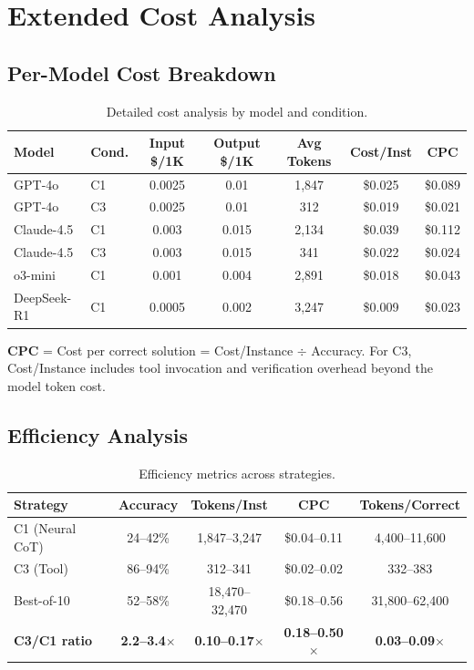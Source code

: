 \documentclass{article}
\theoremstyle{plain}
\theoremstyle{definition}
\theoremstyle{remark}
\begin{document}

\section{Extended Cost Analysis}
\label{app:cost_extended}

\subsection{Per-Model Cost Breakdown}

\begin{table}[h]
\centering
\caption{Detailed cost analysis by model and condition.}
\label{tab:cost_extended}
\small
\begin{tabular}{@{}llccccc@{}}
\toprule
\textbf{Model} & \textbf{Cond.} & \textbf{Input \$/1K} & \textbf{Output \$/1K} & \textbf{Avg Tokens} & \textbf{Cost/Inst} & \textbf{CPC} \\
\midrule
GPT-4o & C1 & 0.0025 & 0.01 & 1,847 & \$0.025 & \$0.089 \\
GPT-4o & C3 & 0.0025 & 0.01 & 312 & \$0.019 & \$0.021 \\
Claude-4.5 & C1 & 0.003 & 0.015 & 2,134 & \$0.039 & \$0.112 \\
Claude-4.5 & C3 & 0.003 & 0.015 & 341 & \$0.022 & \$0.024 \\
o3-mini & C1 & 0.001 & 0.004 & 2,891 & \$0.018 & \$0.043 \\
DeepSeek-R1 & C1 & 0.0005 & 0.002 & 3,247 & \$0.009 & \$0.023 \\
\bottomrule
\end{tabular}
\end{table}

\textbf{CPC} = Cost per correct solution = Cost/Instance $\div$ Accuracy. For C3, Cost/Instance includes tool invocation and verification overhead beyond the model token cost.

\subsection{Efficiency Analysis}

\begin{table}[h]
\centering
\caption{Efficiency metrics across strategies.}
\label{tab:efficiency}
\small
\begin{tabular}{@{}lcccc@{}}
\toprule
\textbf{Strategy} & \textbf{Accuracy} & \textbf{Tokens/Inst} & \textbf{CPC} & \textbf{Tokens/Correct} \\
\midrule
C1 (Neural CoT) & 24--42\% & 1,847--3,247 & \$0.04--0.11 & 4,400--11,600 \\
C3 (Tool) & 86--94\% & 312--341 & \$0.02--0.02 & 332--383 \\
Best-of-10 & 52--58\% & 18,470--32,470 & \$0.18--0.56 & 31,800--62,400 \\
\textbf{C3/C1 ratio} & \textbf{2.2--3.4$\times$} & \textbf{0.10--0.17$\times$} & \textbf{0.18--0.50$\times$} & \textbf{0.03--0.09$\times$} \\
\bottomrule
\end{tabular}
\end{table}
\end{document}
